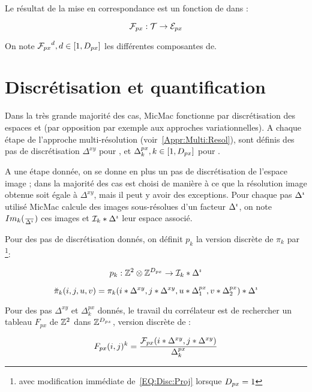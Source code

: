 Le r\'esultat de la mise en correspondance est un fonction  \FPx de
\ETer dans \EPx:

\begin{equation}
   \FPx :   \ETer  \rightarrow  \EPx
\end{equation}

On note ${\FPx}^d,d\in [1,\DimPx]$ les diff\'erentes composantes de\FPx.



\section{Discr\'etisation et quantification}

\label{Disc:Quant}

Dans la tr\`es grande majorit\'e des cas,
MicMac  fonctionne par discr\'etisation
des espaces \ETer et \EPx (par opposition par exemple aux
approches variationnelles). A chaque \'etape
de l'approche multi-r\'esolution (voir~\ref{Appr:Multi:Resol}), sont
d\'efinis des pas de discr\'etisation  $\Delta^{xy}$ pour \ETer ,
et $\Delta^{px}_k, k \in [1,\DimPx]$ pour  \EPx.

A une \'etape donn\'ee, on se donne en plus un pas de
discr\'etisation de l'espace image \DeltaI; dans
la  majorit\'e des cas \DeltaI est choisi
de mani\`ere \`a ce que la r\'esolution image obtenue soit
\'egale \`a  $\Delta^{xy}$,
mais il peut y avoir des exceptions. Pour chaque pas $\DeltaI$
utilis\'e MicMac calcule des images sous-r\'esolues d'un facteur
$\DeltaI$, on note $Im_k(\frac{}{\DeltaI})$ ces images et
$\EIm*\DeltaI$ leur espace associ\'e.


Pour des pas de discr\'etisation donn\'es,
on d\'efinit $p_k$ la version discr\`ete de $\pi_k$ par
\footnote{avec modification imm\'ediate de~\ref{EQ:Disc:Proj}
lorsque $\DimPx=1$}:

\begin{equation}
   p_k : \ZZ^2 \otimes\ZZ^{\DimPx} \rightarrow \EIm*\DeltaI
\end{equation}

\begin{equation}
   \breve\pi_k(i,j,u,v) = \pi_k(i*\Delta^{xy},j*\Delta^{xy},u*\Delta^{px}_1,v*\Delta^{px}_2)*\DeltaI
\label{EQ:Disc:Proj}
\end{equation}

Pour des pas   $\Delta^{xy}$ et $\Delta^{px}_k$ donn\'es, le travail
du corr\'elateur est de rechercher un tableau $F_{px}$ de $\ZZ^2$ dans
$\ZZ^{\DimPx}$, version discr\`ete de \FPx:

\begin{equation}
   F_{px}(i,j)^k = \frac{\FPx(i*\Delta^{xy},j*\Delta^{xy})}{\Delta^{px}_k}
\end{equation}


